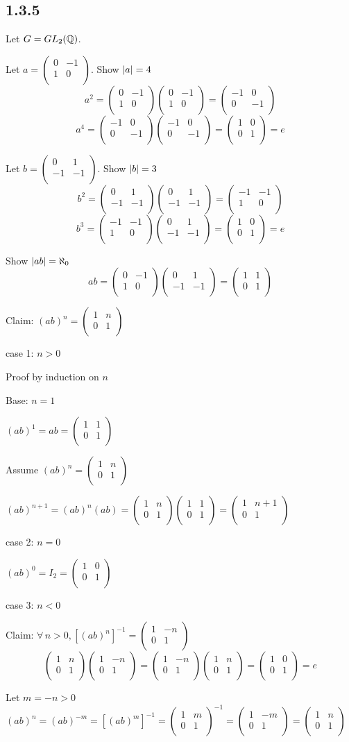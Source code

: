 \documentclass[letterpaper,12pt,fleqn]{article}
\newcommand{\mtx}[4]{\begin{pmatrix}
    #1 & #2 \\
    #3 & #4 \\
  \end{pmatrix}}
\begin{document}
\subsection*{1.3.5}

Let $G=GL_2(\mathbb{Q})$.
\begin{enumerate}
\item Let $a=\mtx{0}{-1}{1}{0}$. Show $\lvert a\rvert=4$
  \[a^2=\mtx{0}{-1}{1}{0}\mtx{0}{-1}{1}{0}=\mtx{-1}{0}{0}{-1}\]
  \[a^4=\mtx{-1}{0}{0}{-1}\mtx{-1}{0}{0}{-1}=\mtx{1}{0}{0}{1}=e\]

\item Let $b=\mtx{0}{1}{-1}{-1}$. Show $\lvert b\rvert=3$
  \[b^2=\mtx{0}{1}{-1}{-1}\mtx{0}{1}{-1}{-1}=\mtx{-1}{-1}{1}{0}\]
  \[b^3=\mtx{-1}{-1}{1}{0}\mtx{0}{1}{-1}{-1}=\mtx{1}{0}{0}{1}=e\]

\item Show $\lvert ab\rvert=\aleph_0$
  \[ab=\mtx{0}{-1}{1}{0}\mtx{0}{1}{-1}{-1}=\mtx{1}{1}{0}{1}\]

  Claim: $(ab)^n=\mtx{1}{n}{0}{1}$

  \begin{description}
  \item case 1: $n>0$

    Proof by induction on $n$

    \begin{description}
    \item Base: $n=1$

      $(ab)^1=ab=\mtx{1}{1}{0}{1}$

    \item Assume $(ab)^n=\mtx{1}{n}{0}{1}$

    \item $(ab)^{n+1}=(ab)^n(ab)=\mtx{1}{n}{0}{1}\mtx{1}{1}{0}{1}=
      \mtx{1}{n+1}{0}{1}$
    \end{description}

  \item case 2: $n=0$

    $(ab)^0=I_2=\mtx{1}{0}{0}{1}$

  \item case 3: $n<0$

    Claim: $\forall\,n>0,[(ab)^n]^{-1}=\mtx{1}{-n}{0}{1}$
    \[\mtx{1}{n}{0}{1}\mtx{1}{-n}{0}{1}=\mtx{1}{-n}{0}{1}\mtx{1}{n}{0}{1}=
    \mtx{1}{0}{0}{1}=e\]

    Let $m=-n>0$ \\
    $(ab)^n=(ab)^{-m}=[(ab)^m]^{-1}=\mtx{1}{m}{0}{1}^{-1}=\mtx{1}{-m}{0}{1}=
    \mtx{1}{n}{0}{1}$
  \end{description}


\end{enumerate}
\end{document}
